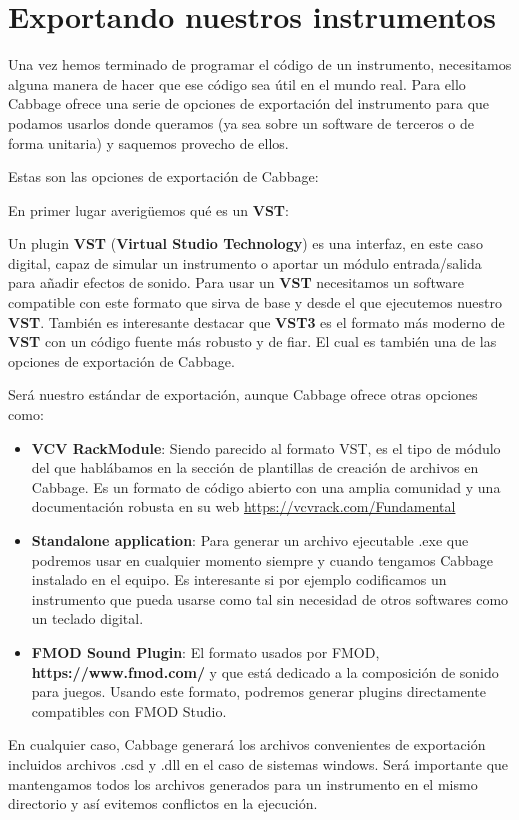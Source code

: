 \section{Exportando nuestros instrumentos}\label{sec:ExportCabbage}

Una vez hemos terminado de programar el código de un instrumento, necesitamos alguna manera de hacer que ese código sea útil en el mundo real. Para ello Cabbage ofrece una serie de opciones de exportación del instrumento para que podamos usarlos donde queramos (ya sea sobre un software de terceros o de forma unitaria) y saquemos provecho de ellos.

Estas son las opciones de exportación de Cabbage:


En primer lugar averigüemos qué es un \textbf{VST}: 

Un plugin \textbf{VST} (\textbf{Virtual Studio Technology}) es una interfaz, en este caso digital, capaz de simular un instrumento o aportar un módulo entrada/salida para añadir efectos de sonido. Para usar un \textbf{VST} necesitamos un software compatible con este formato que sirva de base y desde el que ejecutemos nuestro \textbf{VST}. 
También es interesante destacar que \textbf{VST3} es el formato más moderno de \textbf{VST} con un código fuente más robusto y de fiar. El cual es también una de las opciones de exportación de Cabbage.

Será nuestro estándar de exportación, aunque Cabbage ofrece otras opciones como:

\begin{itemize}
 \item \textbf{VCV RackModule}: Siendo parecido al formato VST, es el tipo de módulo del que hablábamos en la sección de plantillas de creación de archivos en Cabbage. Es un formato de código abierto con una amplia comunidad y una documentación robusta en su web \url{https://vcvrack.com/Fundamental}
 \item \textbf{Standalone application}: Para generar un archivo ejecutable .exe que podremos usar en cualquier momento siempre y cuando tengamos Cabbage instalado en el equipo. Es interesante si por ejemplo codificamos un instrumento que pueda usarse como tal sin necesidad de otros softwares como un teclado digital.
 \item \textbf{FMOD Sound Plugin}: El formato usados por FMOD, \textbf{https://www.fmod.com/} y que está dedicado a la composición de sonido para juegos. Usando este formato, podremos generar plugins directamente compatibles con FMOD Studio.
\end{itemize}

En cualquier caso, Cabbage generará los archivos convenientes de exportación incluidos archivos .csd y .dll en el caso de sistemas windows. Será importante que mantengamos todos los archivos generados para un instrumento en el mismo directorio y así evitemos conflictos en la ejecución.


